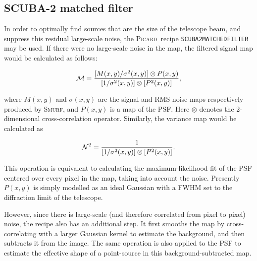 \documentclass[twoside,11pt]{article}
\newcommand{\xref}[3]{#1}
\newcommand{\xlabel}[1]{}
\renewcommand{\_}{\texttt{\symbol{95}}}
\newcommand{\picard}{\xref{\textsc{Picard}}{sun265}{}}
\newcommand{\smurf}{\xref{\textsc{Smurf}}{sun258}{}}
\newcommand{\drrecipe}[1]{\texttt{#1}}
\begin{document}
\newpage
\subsection{\xlabel{matchedfilter}SCUBA-2 matched filter}
\label{app:mf}

In order to optimally find sources that are the size of the telescope
beam, and suppress this residual large-scale noise, the \picard\
recipe \drrecipe{SCUBA2\_MATCHED\_FILTER} may be used. If there were
no large-scale noise in the map, the filtered signal map would be
calculated as follows:

\begin{equation}
  {\cal{M}} = \frac{[M(x,y)/\sigma^2(x,y)] \otimes P(x,y)}
  {[1/\sigma^2(x,y)] \otimes [P^2(x,y)]},
\end{equation}

where $M(x,y)$ and $\sigma(x,y)$ are the signal and RMS
noise maps respectively produced by \smurf, and $P(x,y)$ is a map of the
PSF. Here \(\otimes\) denotes the 2-dimensional cross-correlation
operator. Similarly, the variance map would be calculated as

\begin{equation}
  {\cal{N}}^2 = \frac{1}{[1/\sigma^2(x,y)] \otimes [P^2(x,y)]}.
\end{equation}

This operation is equivalent to calculating the maximum-likelihood fit
of the PSF centered over every pixel in the map, taking into account
the noise. Presently $P(x,y)$ is simply modelled as an ideal Gaussian
with a FWHM set to the diffraction limit of the telescope.

However, since there is large-scale (and therefore correlated from
pixel to pixel) noise, the recipe also has an additional step. It
first smooths the map by cross-correlating with a larger Gaussian
kernel to estimate the background, and then subtracts it from the
image. The same operation is also applied to the PSF to estimate the
effective shape of a point-source in this background-subtracted map.
\end{document}
